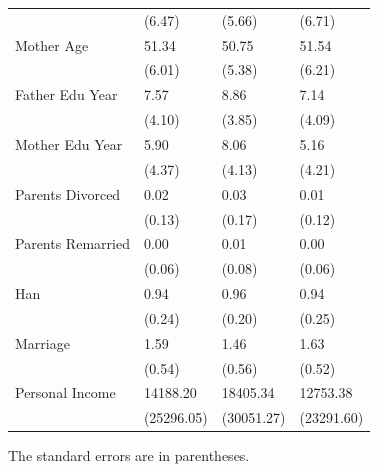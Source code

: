\documentclass[
  12pt,
  12pt]{article}
\numberwithin{equation}{section}
\theoremstyle{definition}
\theoremstyle{plain}
\theoremstyle{plain}
\theoremstyle{remark}
\begin{document}
\begin{table}
{\begin{threeparttable}
\begin{tabular}{llll}
                            & (6.47)        & (5.66)       & (6.71)           \\
Mother Age                  & 51.34         & 50.75        & 51.54            \\
                            & (6.01)        & (5.38)       & (6.21)           \\
Father Edu Year             & 7.57          & 8.86         & 7.14             \\
                            & (4.10)        & (3.85)       & (4.09)           \\
Mother Edu Year             & 5.90          & 8.06         & 5.16             \\
                            & (4.37)        & (4.13)       & (4.21)           \\
Parents Divorced            & 0.02          & 0.03         & 0.01             \\
                            & (0.13)        & (0.17)       & (0.12)           \\
Parents Remarried           & 0.00          & 0.01         & 0.00             \\
                            & (0.06)        & (0.08)       & (0.06)           \\
Han                         & 0.94          & 0.96         & 0.94             \\
                            & (0.24)        & (0.20)       & (0.25)           \\ 
Marriage                    & 1.59          & 1.46         & 1.63             \\
                            & (0.54)        & (0.56)       & (0.52)           \\ 
Personal Income             & 14188.20      & 18405.34     & 12753.38         \\
                            & (25296.05)    & (30051.27)   & (23291.60)       \\ \hline
\end{tabular}
\begin{tablenotes}
\footnotesize
\item The standard errors are in parentheses.
\end{tablenotes}
\end{threeparttable}

}

\end{table}%

\newpage
\end{document}
